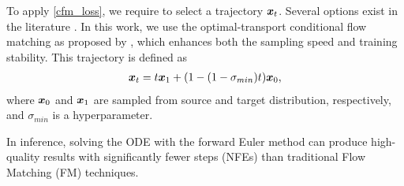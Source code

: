 To apply \eqref{cfm_loss}, we require to select a trajectory $\bm{x}_t$. 
Several options exist in the literature \cite{ho2020denoising,lipman2023flow,liu2023flow}. In this work, we use the optimal-transport conditional flow matching as proposed by \citet{lipman2023flow}, which enhances both the sampling speed and training stability. This trajectory is defined as
\begin{align}\label{fm_flow}
    \bm{x}_t=t\bm{x}_1+(1-(1-\sigma_{min})t)\bm{x}_0,
\end{align}
where $\bm{x}_0$ and $\bm{x}_1$ are sampled from source and target distribution, respectively, and $\sigma_{min}$ is a hyperparameter.  

In inference, solving the ODE with the forward Euler method can produce high-quality results with significantly fewer steps (NFEs) than traditional Flow Matching (FM) techniques.


